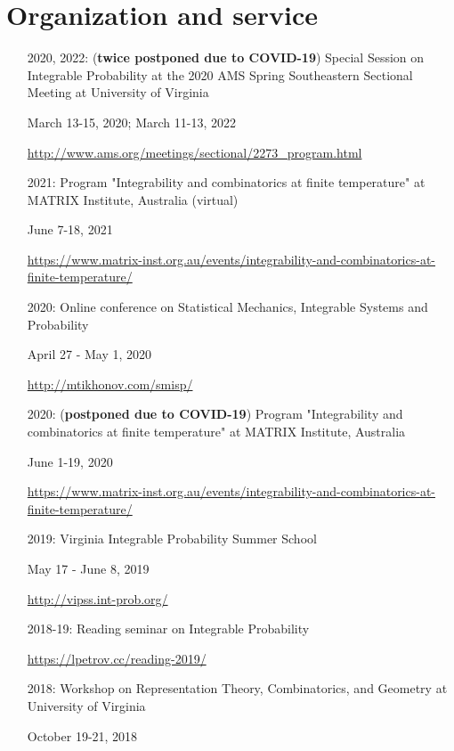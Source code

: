 \documentclass[letterpaper,11pt]{article}
\begin{document}
\section*{Organization and service}

\begin{itemize}
	\item [2020, 2022:]
	(\textbf{twice postponed due to COVID-19})
		Special Session on Integrable Probability
		at the 2020 AMS Spring Southeastern Sectional Meeting at 
		University of Virginia
		
		March 13-15, 2020; March 11-13, 2022

		\url{http://www.ams.org/meetings/sectional/2273_program.html}
		
	\item [2021:]
		Program "Integrability and combinatorics at finite temperature"
		at MATRIX Institute, Australia
		(virtual)

		June 7-18, 2021

		\url{https://www.matrix-inst.org.au/events/integrability-and-combinatorics-at-finite-temperature/}
	\item [2020:]
		Online conference on Statistical Mechanics, Integrable Systems and Probability
		
		April 27 - May 1, 2020

		\url{http://mtikhonov.com/smisp/}
	\item [2020:]
	(\textbf{postponed due to COVID-19})
		Program "Integrability and combinatorics at finite temperature"
		at MATRIX Institute,
		Australia

		June 1-19, 2020

		\url{https://www.matrix-inst.org.au/events/integrability-and-combinatorics-at-finite-temperature/}

	\item [2019:]
		Virginia Integrable Probability Summer School
		
		May 17 - June 8, 2019

		\url{http://vipss.int-prob.org/}

	\item[2018-19:]
	      Reading seminar on Integrable Probability

	      \url{https://lpetrov.cc/reading-2019/}
		
	\item [2018:]
		Workshop on Representation Theory, Combinatorics, and Geometry
		at University of
		Virginia
		
		October 19-21, 2018
	

\end{itemize}
\end{document}
